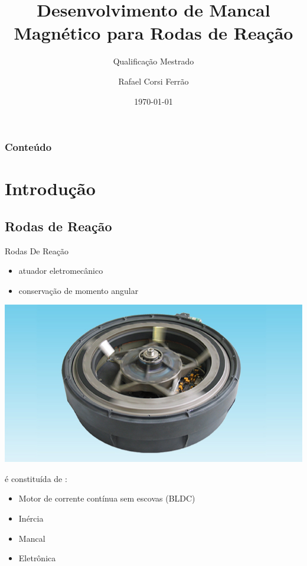 \documentclass{beamer}
\title{Desenvolvimento de Mancal Magnético  para Rodas de Reação}
\subtitle{Qualificação Mestrado}
\author{Rafael Corsi Ferrão}
\date{\today}
\institute{\url{rafael.corsi@maua.br} \\\url{http://www.maua.br}}
\begin{document}
\begin{frame}[plain,t]
	\titlepage
\end{frame}

\begin{frame}
	\frametitle{Conteúdo}
		\tableofcontents
\end{frame}

\section{Introdução}

\subsection{Rodas de Reação}
\begin{frame}{Rodas De Reação}

	\begin{itemize}
		\item atuador eletromecânico
		\item conservação de momento angular
	\end{itemize}
	
	\begin{center}
	\includegraphics[width=0.5\linewidth]{MWI.jpg}
	\end{center}
	
	é constituída de :
	
	\begin{itemize}
		\item Motor de corrente contínua sem escovas (BLDC)
		\item Inércia
		\item Mancal
		\item Eletrônica
	\end{itemize}
\end{frame}
\end{document}
